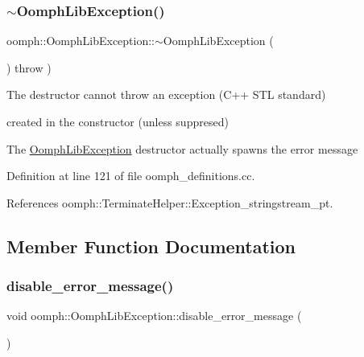 \mbox{\label{classoomph_1_1OomphLibException_a0cc216d83aa854e965c3c8376d2c4d39}} 
\subsubsection{\texorpdfstring{$\sim$\+Oomph\+Lib\+Exception()}{~OomphLibException()}}
{\footnotesize\ttfamily oomph\+::\+Oomph\+Lib\+Exception\+::$\sim$\+Oomph\+Lib\+Exception (\begin{DoxyParamCaption}{ }\end{DoxyParamCaption}) throw  ) \hspace{0.3cm}{\ttfamily [protected]}}



The destructor cannot throw an exception (C++ S\+TL standard) 

created in the constructor (unless suppresed)

The \hyperlink{classoomph_1_1OomphLibException}{Oomph\+Lib\+Exception} destructor actually spawns the error message 

Definition at line 121 of file oomph\+\_\+definitions.\+cc.



References oomph\+::\+Terminate\+Helper\+::\+Exception\+\_\+stringstream\+\_\+pt.



\subsection{Member Function Documentation}
\mbox{\label{classoomph_1_1OomphLibException_a92da7bc6b484044587ca2e8db4e1e507}} 
\subsubsection{\texorpdfstring{disable\+\_\+error\+\_\+message()}{disable\_error\_message()}}
{\footnotesize\ttfamily void oomph\+::\+Oomph\+Lib\+Exception\+::disable\+\_\+error\+\_\+message (\begin{DoxyParamCaption}{ }\end{DoxyParamCaption})\hspace{0.3cm}{\ttfamily [inline]}}



